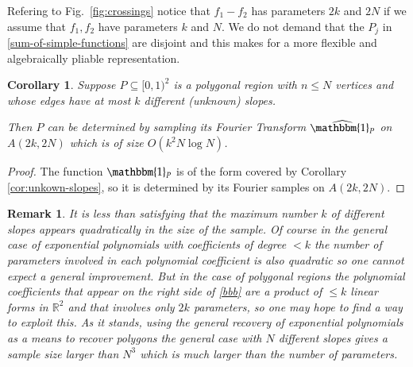 \documentclass[12pt,a4paper,oneside]{amsart}
\newtheorem{corollary}{Corollary}[section]
\newtheorem{remark}{Remark}[section]
\theoremstyle{definition}
\newcommand{\RR}{{\mathbb R}}
\newcommand{\one}{{\mathbbm{1}}}
\newcommand{\ft}[1]{\widehat{#1}}
\newcounter{rem}
\begin{document}
Refering to Fig.\ \ref{fig:crossings} notice that $f_1-f_2$ has parameters $2k$ and $2N$ if we assume that $f_1, f_2$ have parameters $k$ and $N$. We do not demand that the $P_j$ in \eqref{sum-of-simple-functions} are disjoint and this makes for a more flexible and algebraically pliable representation.

\begin{corollary}\label{cor:polygons-unkown-slopes}
Suppose $P \subseteq [0, 1)^2$ is a polygonal region with $n \le N$ vertices and whose edges have at most $k$ different (unknown) slopes.

Then $P$ can be determined by sampling its Fourier Transform $\ft{\one_P}$ on
$A(2k, 2N)$ which is of size $O(k^2 N \log N)$.
\end{corollary}

\begin{proof}
The function $\one_P$ is of the form covered by Corollary \ref{cor:unkown-slopes}, so it is determined by its Fourier samples on $A(2k, 2N)$.

\end{proof}

\begin{remark}
It is less than satisfying that the maximum number $k$ of different slopes appears quadratically in the size of the sample. Of course in the general case of exponential polynomials with coefficients of degree $< k$ the number of parameters involved in each polynomial coefficient is also quadratic so one cannot expect a general improvement. But in the case of polygonal regions the polynomial coefficients that appear on the right side of \eqref{bbb} are a product of $\le k$ linear forms in $\RR^2$ and that involves only $2k$ parameters, so one may hope to find a way to exploit this. As it stands, using the general recovery of exponential polynomials as a means to recover polygons the general case with $N$ different slopes gives a sample size larger than $N^3$ which is much larger than the number of parameters.
\end{remark}




\end{document}

